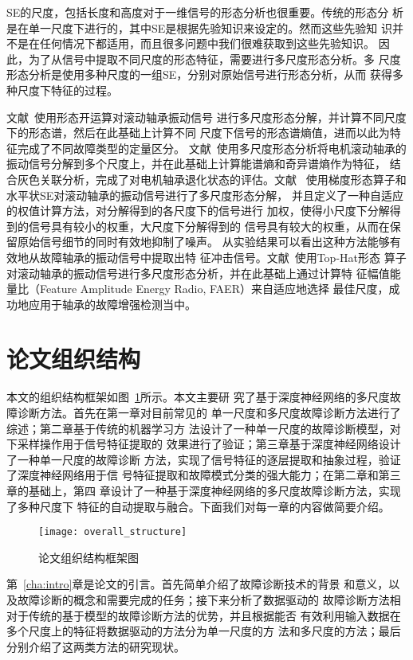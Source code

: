 SE的尺度，包括长度和高度对于一维信号的形态分析也很重要。传统的形态分
析是在单一尺度下进行的，其中SE是根据先验知识来设定的。然而这些先验知
识并不是在任何情况下都适用，而且很多问题中我们很难获取到这些先验知识。
因此，为了从信号中提取不同尺度的形态特征，需要进行多尺度形态分析。多
尺度形态分析是使用多种尺度的一组SE，分别对原始信号进行形态分析，从而
获得多种尺度下特征的过程。

文献~使用形态开运算对滚动轴承振动信号
进行多尺度形态分解，并计算不同尺度下的形态谱，然后在此基础上计算不同
尺度下信号的形态谱熵值，进而以此为特征完成了不同故障类型的定量区分。
文献~使用多尺度形态分析将电机滚动轴承的
振动信号分解到多个尺度上，并在此基础上计算能谱熵和奇异谱熵作为特征，
结合灰色关联分析，完成了对电机轴承退化状态的评估。文献~
使用梯度形态算子和水平状SE对滚动轴承的振动信号进行了多尺度形态分解，
并且定义了一种自适应的权值计算方法，对分解得到的各尺度下的信号进行
加权，使得小尺度下分解得到的信号具有较小的权重，大尺度下分解得到的
信号具有较大的权重，从而在保留原始信号细节的同时有效地抑制了噪声。
从实验结果可以看出这种方法能够有效地从故障轴承的振动信号中提取出特
征冲击信号。文献~使用Top-Hat形态
算子对滚动轴承的振动信号进行多尺度形态分析，并在此基础上通过计算特
征幅值能量比（Feature Amplitude Energy Radio, FAER）来自适应地选择
最佳尺度，成功地应用于轴承的故障增强检测当中。

\section{论文组织结构}

本文的组织结构框架如图~\ref{fig:overall_structure}所示。本文主要研
究了基于深度神经网络的多尺度故障诊断方法。首先在第一章对目前常见的
单一尺度和多尺度故障诊断方法进行了综述；第二章基于传统的机器学习方
法设计了一种单一尺度的故障诊断模型，对下采样操作用于信号特征提取的
效果进行了验证；第三章基于深度神经网络设计了一种单一尺度的故障诊断
方法，实现了信号特征的逐层提取和抽象过程，验证了深度神经网络用于信
号特征提取和故障模式分类的强大能力；在第二章和第三章的基础上，第四
章设计了一种基于深度神经网络的多尺度故障诊断方法，实现了多种尺度下
特征的自动提取与融合。下面我们对每一章的内容做简要介绍。
\begin{figure}[ht]
  \centering
  \texttt{[image: overall\_structure]}
  \caption{论文组织结构框架图}
  \label{fig:overall_structure}
\end{figure}

第~\ref{cha:intro}章是论文的引言。首先简单介绍了故障诊断技术的背景
和意义，以及故障诊断的概念和需要完成的任务；接下来分析了数据驱动的
故障诊断方法相对于传统的基于模型的故障诊断方法的优势，并且根据能否
有效利用输入数据在多个尺度上的特征将数据驱动的方法分为单一尺度的方
法和多尺度的方法；最后分别介绍了这两类方法的研究现状。

